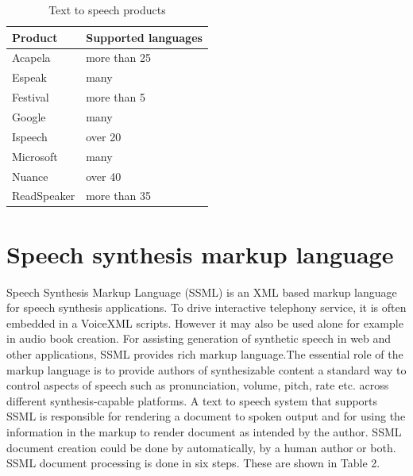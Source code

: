 \documentclass[11pt,a4paper,oneside,article]{memoir}
\begin{document}
\begin{table}[h]

 \caption{Text to speech products}
    \begin{tabular}{ | l | l | }
    \hline
    \textbf{Product} & \textbf{Supported languages} \\ \hline
    Acapela & more than 25  \\ \hline
    Espeak &  many    \\ \hline
    Festival &  more than 5 \\ \hline
    Google &  many    \\ \hline
    Ispeech & over 20  \\ \hline
    Microsoft &  many   \\ \hline
    Nuance & over 40  \\ \hline
    ReadSpeaker & more than 35\\ \hline
    \end{tabular}

\end{table}

\section{Speech synthesis markup language}
Speech Synthesis Markup Language (SSML) is an XML based markup language for speech synthesis applications. To drive interactive telephony service, it is often embedded in a VoiceXML scripts. However it may also be used alone for example in audio book creation. For assisting generation of synthetic speech in web and other applications, SSML provides rich markup language.The essential role of the markup language is to provide authors of synthesizable content a standard way to control aspects of speech such as pronunciation, volume, pitch, rate etc.  across different synthesis-capable platforms.\cite{w3}
A text to speech system that supports SSML is responsible for rendering a document to spoken output and for using the information in the markup to render document as intended by the author. SSML document creation could be done by automatically, by a human author or both. SSML document processing is done in six steps. These are shown in Table 2.\\
\end{document}
